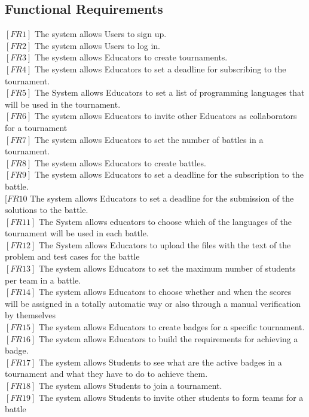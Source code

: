 \documentclass{article}
\begin{document}
\subsection{Functional Requirements}
$[FR1]$ The system allows Users to sign up.\\
$[FR2]$ The system allows Users to log in.\\
$[FR3]$ The system allows Educators to create tournaments.\\
$[FR4]$ The system allows Educators to set a deadline for subscribing to the tournament.\\
$[FR5]$ The System allows Educators to set a list of programming languages that will be used in the tournament.\\
$[FR6]$ The system allows Educators to invite other Educators as collaborators for a tournament\\
$[FR7]$ The system allows Educators to set the number of battles in a tournament.\\
$[FR8]$ The system allows Educators to create battles.\\
$[FR9]$ The system allows Educators to set a deadline for the subscription to the battle.\\
$[FR10$ The system allows Educators to set a deadline for the submission of the solutions to the battle.\\
$[FR11]$ The System allows educators to choose which of the languages of the tournament will be used in each battle.\\
$[FR12]$ The System allows Educators to upload the files with the text of the problem and test cases for the battle\\
$[FR13]$ The system allows Educators to set the maximum number of students per team in a battle.\\
$[FR14]$ The system allows Educators to choose whether and when the scores will be assigned in a totally automatic way or also through a manual verification by themselves\\
$[FR15]$ The system allows Educators to create badges for a specific tournament.\\
$[FR16]$ The system allows Educators to build the requirements for achieving a badge.\\
$[FR17]$ The system allows Students to see what are the active badges in a tournament and what they have to do to achieve them.\\
$[FR18]$ The system allows Students to join a tournament.\\
$[FR19]$ The system allows Students to invite other students to form teams for a battle\\
\end{document}
